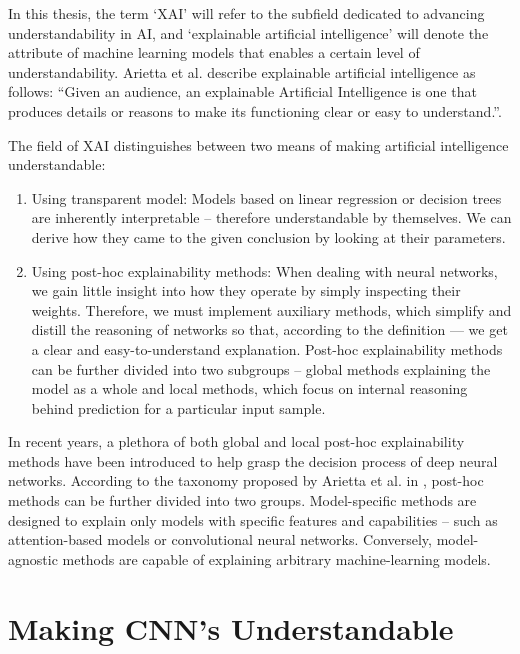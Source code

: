 In this thesis, the term `XAI' will refer to the subfield dedicated to advancing understandability in AI, and `explainable artificial intelligence' will denote the attribute of machine learning models that enables a certain level of understandability.
Arietta et al. \cite{arrieta-taxonomy} describe explainable artificial intelligence as follows: ``Given an audience, an explainable Artificial Intelligence is one that produces details or reasons to make its functioning clear or easy to understand.''.

The field of XAI distinguishes between two means of making artificial intelligence understandable:
\begin{enumerate}
    \item Using transparent model: Models based on linear regression or decision trees are inherently interpretable -- therefore understandable by themselves. We can derive how they came to the given conclusion by looking at their parameters.
    \item Using post-hoc explainability methods: When dealing with neural networks, we gain little insight into how they operate by simply inspecting their weights. Therefore, we must implement auxiliary methods, which simplify and distill the reasoning of networks so that, according to the definition --- we get a clear and easy-to-understand explanation. Post-hoc explainability methods can be further divided into two subgroups -- global methods explaining the model as a whole and local methods, which focus on internal reasoning behind prediction for a particular input sample.
\end{enumerate}

In recent years, a plethora of both global and local post-hoc explainability methods have been introduced to help grasp the decision process of deep neural networks.
According to the taxonomy proposed by Arietta et al. in \cite{arrieta-taxonomy}, post-hoc methods can be further divided into two groups. 
Model-specific methods are designed to explain only models with specific features and capabilities -- such as attention-based models or convolutional neural networks.
Conversely, model-agnostic methods are capable of explaining arbitrary machine-learning models.

\section{Making CNN's Understandable}\label{sec:xai-cnn}

